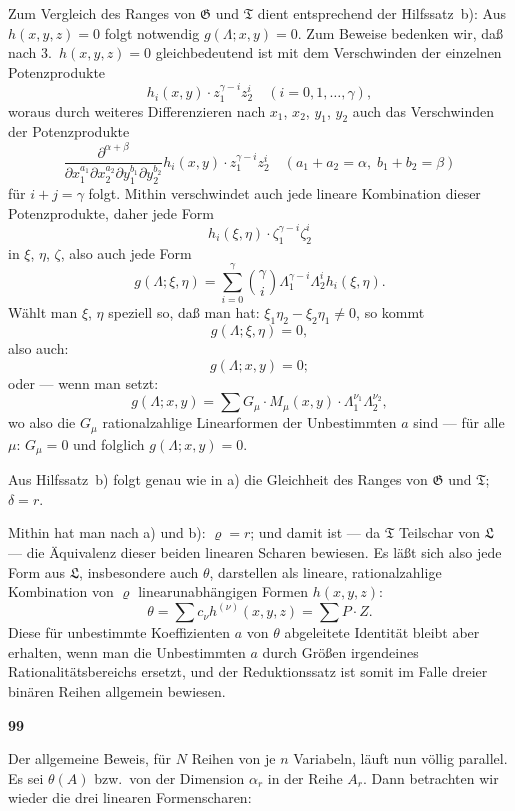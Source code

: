 \documentclass[12pt,a4paper]{article}
\begin{document}
Zum Vergleich des Ranges von $\mathfrak{G}$ und $\mathfrak{T}$ dient entsprechend der Hilfssatz~b): Aus $h(x, y, z) = 0$ folgt notwendig $g(\Lambda; x, y) = 0$. Zum Beweise bedenken wir, da\ss{} nach 3.\ $h(x, y, z) = 0$ gleichbedeutend ist mit dem Verschwinden der einzelnen Potenzprodukte
\[h_i(x, y) \cdot z_1^{\gamma-i} z_2^i \quad (i = 0, 1, \ldots, \gamma),\]
woraus durch weiteres Differenzieren nach $x_1$, $x_2$, $y_1$, $y_2$ auch das Verschwinden der Potenzprodukte
\[\frac{\partial^{\alpha+\beta}}{\partial x_1^{a_1} \partial x_2^{a_2} \partial y_1^{b_1} \partial y_2^{b_2}} h_i(x, y) \cdot z_1^{\gamma-i} z_2^i \quad (a_1 + a_2 = \alpha, \; b_1 + b_2 = \beta)\]
f\"ur $i + j = \gamma$ folgt. Mithin verschwindet auch jede lineare Kombination dieser Potenzprodukte, daher jede Form
\[h_i(\xi, \eta) \cdot \zeta_1^{\gamma-i} \zeta_2^i\]
in $\xi$, $\eta$, $\zeta$, also auch jede Form
\[g(\Lambda; \xi, \eta) = \sum_{i=0}^{\gamma} \binom{\gamma}{i} \Lambda_1^{\gamma-i} \Lambda_2^i h_i(\xi, \eta).\]
W\"ahlt man $\xi$, $\eta$ speziell so, da\ss{} man hat: $\xi_1 \eta_2 - \xi_2 \eta_1 \neq 0$, so kommt
\[g(\Lambda; \xi, \eta) = 0,\]
also auch:
\[g(\Lambda; x, y) = 0;\]
oder --- wenn man setzt:
\[g(\Lambda; x, y) = \sum G_{\mu} \cdot M_{\mu}(x, y) \cdot \Lambda_1^{\nu_1} \Lambda_2^{\nu_2},\]
wo also die $G_{\mu}$ rationalzahlige Linearformen der Unbestimmten $a$ sind --- f\"ur alle $\mu$: $G_{\mu} = 0$ und folglich $g(\Lambda; x, y) = 0$.

Aus Hilfssatz~b) folgt genau wie in a) die Gleichheit des Ranges von $\mathfrak{G}$ und $\mathfrak{T}$; $\delta = r$.

Mithin hat man nach a) und b): $\varrho = r$; und damit ist --- da $\mathfrak{T}$ Teilschar von $\mathfrak{L}$ --- die Äquivalenz dieser beiden linearen Scharen bewiesen. Es l\"a\ss t sich also jede Form aus $\mathfrak{L}$, insbesondere auch $\theta$, darstellen als lineare, rationalzahlige Kombination von $\varrho$ linearunabh\"angigen Formen $h(x, y, z)$:
\[
\theta = \sum c_{\nu} h^{(\nu)}(x, y, z) = \sum P \cdot Z.
\]
Diese f\"ur unbestimmte Koeffizienten $a$ von $\theta$ abgeleitete Identit\"at bleibt aber erhalten, wenn man die Unbestimmten $a$ durch Gr\"o\ss en irgendeines Rationalit\"atsbereichs ersetzt, und der Reduktionssatz ist somit im Falle dreier bin\"aren Reihen allgemein bewiesen.

\newpage
\begin{center}
\textbf{99}
\end{center}

Der allgemeine Beweis, f\"ur $N$ Reihen von je $n$ Variabeln, l\"auft nun v\"ollig parallel. Es sei $\theta(A)$ bzw.\ von der Dimension $\alpha_r$ in der Reihe $A_r$. Dann betrachten wir wieder die drei linearen Formenscharen:
\end{document}
